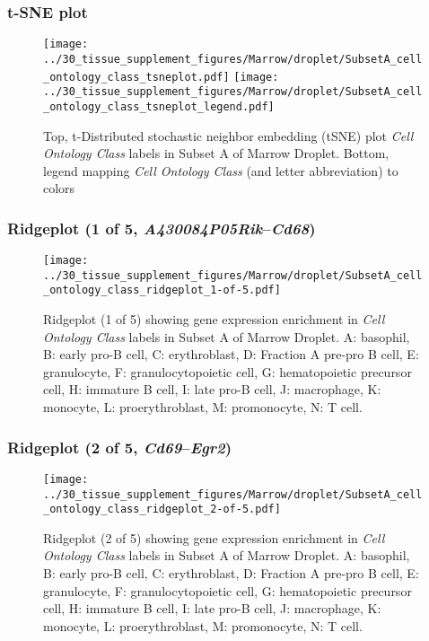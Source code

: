 \clearpage
\subsubsection{t-SNE plot}
\begin{figure}[h]
\centering
\texttt{[image: ../30\_tissue\_supplement\_figures/Marrow/droplet/SubsetA\_cell\_ontology\_class\_tsneplot.pdf]}
\texttt{[image: ../30\_tissue\_supplement\_figures/Marrow/droplet/SubsetA\_cell\_ontology\_class\_tsneplot\_legend.pdf]}
\caption{Top, t-Distributed stochastic neighbor embedding (tSNE) plot  \emph{Cell Ontology Class} labels in Subset A of Marrow Droplet. Bottom, legend mapping \emph{Cell Ontology Class} (and letter abbreviation) to colors}
\end{figure}


\clearpage

\subsubsection{Ridgeplot (1 of 5, \emph{A430084P05Rik}--\emph{Cd68})}
\begin{figure}[h]
\centering
\texttt{[image: ../30\_tissue\_supplement\_figures/Marrow/droplet/SubsetA\_cell\_ontology\_class\_ridgeplot\_1-of-5.pdf]}

\caption{ Ridgeplot (1 of 5)  showing gene expression enrichment in \emph{Cell Ontology Class} labels in Subset A of Marrow Droplet. A: basophil, B: early pro-B cell, C: erythroblast, D: Fraction A pre-pro B cell, E: granulocyte, F: granulocytopoietic cell, G: hematopoietic precursor cell, H: immature B cell, I: late pro-B cell, J: macrophage, K: monocyte, L: proerythroblast, M: promonocyte, N: T cell.}
\end{figure}


\clearpage

\subsubsection{Ridgeplot (2 of 5, \emph{Cd69}--\emph{Egr2})}
\begin{figure}[h]
\centering
\texttt{[image: ../30\_tissue\_supplement\_figures/Marrow/droplet/SubsetA\_cell\_ontology\_class\_ridgeplot\_2-of-5.pdf]}

\caption{ Ridgeplot (2 of 5)  showing gene expression enrichment in \emph{Cell Ontology Class} labels in Subset A of Marrow Droplet. A: basophil, B: early pro-B cell, C: erythroblast, D: Fraction A pre-pro B cell, E: granulocyte, F: granulocytopoietic cell, G: hematopoietic precursor cell, H: immature B cell, I: late pro-B cell, J: macrophage, K: monocyte, L: proerythroblast, M: promonocyte, N: T cell.}
\end{figure}


